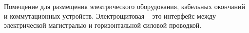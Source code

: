 Помещение для размещения электрического оборудования,
кабельных окончаний и коммутационных устройств.
Электрощитовая -- это интерфейс между электрической магистралью
и горизонтальной силовой проводкой.